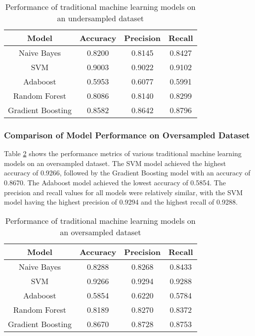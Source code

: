 \documentclass[12pt, a4paper]{article}
\begin{document}
\newline
\begin{center}
\begin{table}[ht]
\centering
\begin{tabular}{|c|c|c|c|}
\hline
\textbf{Model} & \textbf{Accuracy} & \textbf{Precision} & \textbf{Recall} \\
\hline
Naive Bayes & 0.8200 & 0.8145 & 0.8427 \\
SVM & 0.9003 & 0.9022 & 0.9102 \\
Adaboost & 0.5953 & 0.6077 & 0.5991 \\
Random Forest & 0.8086 & 0.8140 & 0.8299 \\
Gradient Boosting & 0.8582 & 0.8642 & 0.8796 \\
\hline
\end{tabular}
\caption{Performance of traditional machine learning models on an undersampled dataset}
\label{tab:traditional_undersampled_results}
\end{table}
\end{center}

\subsubsection{Comparison of Model Performance on Oversampled Dataset}

Table \ref{tab:traditional_oversampled_results} shows the performance metrics of various traditional machine learning models on an oversampled dataset. The SVM model achieved the highest accuracy of 0.9266, followed by the Gradient Boosting model with an accuracy of 0.8670. The Adaboost model achieved the lowest accuracy of 0.5854. The precision and recall values for all models were relatively similar, with the SVM model having the highest precision of 0.9294 and the highest recall of 0.9288.

\newline
\begin{center}
\begin{table}[ht]
\centering
\begin{tabular}{|c|c|c|c|}
\hline
\textbf{Model} & \textbf{Accuracy} & \textbf{Precision} & \textbf{Recall} \\
\hline
Naive Bayes & 0.8288 & 0.8268 & 0.8433 \\
SVM & 0.9266 & 0.9294 & 0.9288 \\
Adaboost & 0.5854 & 0.6220 & 0.5784 \\
Random Forest & 0.8189 & 0.8270 & 0.8372 \\
Gradient Boosting & 0.8670 & 0.8728 & 0.8753 \\
\hline
\end{tabular}
\caption{Performance of traditional machine learning models on an oversampled dataset}
\label{tab:traditional_oversampled_results}
\end{table}
\end{center}
\end{document}
